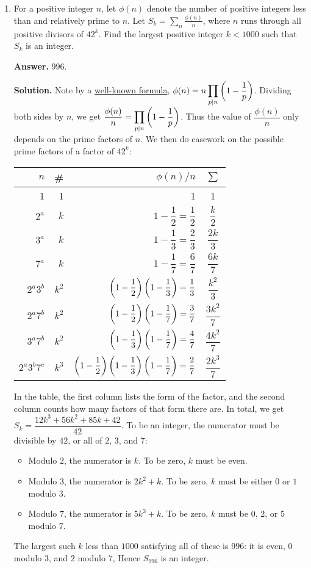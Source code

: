\documentclass[11pt,paper=letter]{scrartcl}
\begin{document}
\begin{enumerate}[left=0pt]

\item For a positive integer $n$, let $\phi(n)$ denote the number of positive integers less than and relatively prime to $n$. Let $\displaystyle S_k = \sum_n \frac{\phi(n)}{n}$, where $n$ runs through all positive divisors of $42^k$. Find the largest positive integer $k < 1000$ such that $S_k$ is an integer.

{\sffamily \bfseries Answer.} $\boxed{996}$.

{\sffamily \bfseries Solution.} Note by a \href{https://en.wikipedia.org/wiki/Euler%27s_totient_function#Euler's_product_formula}{well-known formula}, $\displaystyle \phi(n) = n \prod_{p|n} \left( 1 - \frac1p \right)$. Dividing both sides by $n$, we get $\displaystyle \frac{\phi(n)}n = \prod_{p|n} \left( 1 - \frac1p \right)$. Thus the value of $\dfrac{\phi(n)}{n}$ only depends on the prime factors of $n$. We then do casework on the possible prime factors of a factor of $42^k$:
\begin{center}
  \begin{tabular}{rrr|c}
  $n$ & \# & $\phi(n)/n$ & $\sum$ \\ \hline
  1 & 1 & 1 & 1 \\
  $2^a$ & $k$ & $1 - \dfrac12 = \dfrac12$ & $\dfrac k2$ \\[8pt]
  $3^a$ & $k$ & $1 - \dfrac13 = \dfrac23$ & $\dfrac{2k}3$ \\[8pt]
  $7^a$ & $k$ & $1 - \dfrac17 = \dfrac67$ & $\dfrac{6k}7$ \\[8pt]
  $2^a3^b$ & $k^2$ & $\left( 1 - \dfrac12 \right)\left( 1 - \dfrac13 \right) = \dfrac13$ & $\dfrac {k^2}3$ \\[8pt]
  $2^a7^b$ & $k^2$ & $\left( 1 - \dfrac12 \right)\left( 1 - \dfrac17 \right) = \dfrac37$ & $\dfrac {3k^2}7$ \\[8pt]
  $3^a7^b$ & $k^2$ & $\left( 1 - \dfrac13 \right)\left( 1 - \dfrac17 \right) = \dfrac47$ & $\dfrac {4k^2}7$ \\[8pt]
  $2^a3^b7^c$ & $k^3$ & $\left( 1 - \dfrac12 \right)\left( 1 - \dfrac13 \right)\left( 1 - \dfrac17 \right) = \dfrac27$ & $\dfrac {2k^3}7$
  \end{tabular}
\end{center}
In the table, the first column lists the form of the factor, and the second column counts how many factors of that form there are. In total, we get $S_k = \dfrac{12k^3 + 56k^2 + 85k + 42}{42}$. To be an integer, the numerator must be divisible by $42$, or all of $2$, $3$, and $7$:
\begin{itemize}
  \item Modulo $2$, the numerator is $k$. To be zero, $k$ must be even.
  \item Modulo $3$, the numerator is $2k^2 + k$. To be zero, $k$ must be either $0$ or $1$ modulo $3$.
  \item Modulo $7$, the numerator is $5k^3 + k$. To be zero, $k$ must be $0$, $2$, or $5$ modulo $7$.
\end{itemize}
The largest such $k$ less than $1000$ satisfying all of these is $996$: it is even, $0$ modulo $3$, and $2$ modulo $7$, Hence $S_{996}$ is an integer.


\end{enumerate}
\end{document}

